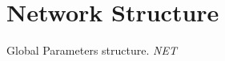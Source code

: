 \documentclass[onecolumn, 12pt]{IEEEtran}
\begin{document}
\section{Network Structure}
\label{sec:str}
%
Global Parameters structure. 
\emph{NET}
%
%
%
\end{document}
